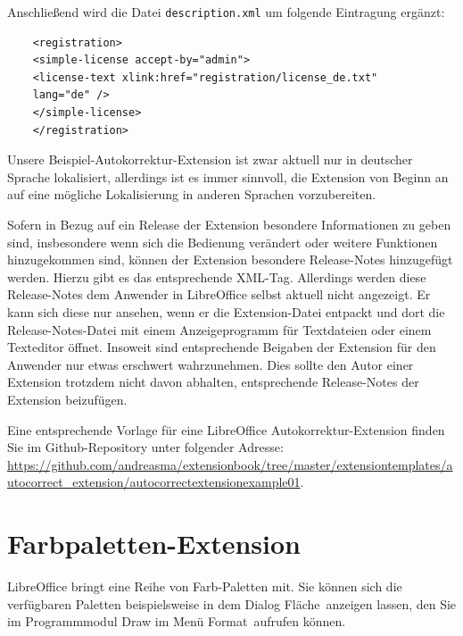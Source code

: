\documentclass[12pt,a4paper,titlepage]{book}
\begin{document}
Anschließend wird die Datei \verb|description.xml| um folgende Eintragung ergänzt:
\begin{lstlisting}
	<registration>
	<simple-license accept-by="admin">
	<license-text xlink:href="registration/license_de.txt" 
	lang="de" />
	</simple-license>
	</registration>
\end{lstlisting}

Unsere Beispiel-Autokorrektur-Extension ist zwar aktuell nur in deutscher Sprache lokalisiert, allerdings ist es immer sinnvoll, die Extension von Beginn an auf eine mögliche Lokalisierung in anderen Sprachen vorzubereiten.

Sofern in Bezug auf ein Release der Extension besondere Informationen zu geben sind, insbesondere wenn sich die Bedienung verändert oder weitere Funktionen hinzugekommen sind, können der Extension besondere Release-Notes hinzugefügt werden. Hierzu gibt es das entsprechende XML-Tag. Allerdings werden diese Release-Notes dem Anwender in LibreOffice selbst aktuell nicht angezeigt. Er kann sich diese nur ansehen, wenn er die Extension-Datei entpackt und dort die Release-Notes-Datei mit einem Anzeigeprogramm für Textdateien oder einem Texteditor öffnet. Insoweit sind entsprechende Beigaben der Extension für den Anwender nur etwas erschwert wahrzunehmen. Dies sollte den Autor einer Extension trotzdem nicht davon abhalten, entsprechende Release-Notes der Extension beizufügen.

Eine entsprechende Vorlage für eine LibreOffice Autokorrektur-Extension finden Sie im Github-Repository unter folgender Adresse:\linebreak
\url{https://github.com/andreasma/extensionbook/tree/master/extensiontemplates/autocorrect_extension/autocorrectextensionexample01}.


\section{Farbpaletten-Extension}

LibreOffice bringt eine Reihe von Farb-Paletten mit. Sie können sich die verfügbaren Paletten beispielsweise in dem Dialog \glqq Fläche\grqq~anzeigen lassen, den Sie im Programmmodul Draw im Menü \glqq Format\grqq~aufrufen können.
\end{document}
